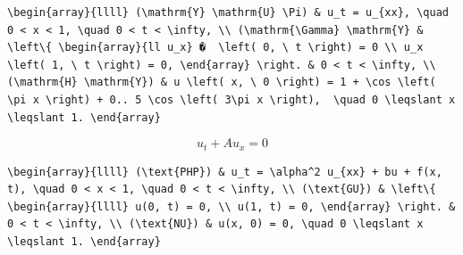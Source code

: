 \documentclass[
  ukrainian,
]{article}
\begin{document}
\begin{verbatim}
\begin{array}{llll} (\mathrm{Y} \mathrm{U} \Pi) & u_t = u_{xx}, \quad 0 < x < 1, \quad 0 < t < \infty, \\ (\mathrm{\Gamma} \mathrm{Y} & \left\{ \begin{array}{ll u_x} �  \left( 0, \ t \right) = 0 \\ u_x \left( 1, \ t \right) = 0, \end{array} \right. & 0 < t < \infty, \\ (\mathrm{H} \mathrm{Y}) & u \left( x, \ 0 \right) = 1 + \cos \left( \pi x \right) + 0.. 5 \cos \left( 3\pi x \right),  \quad 0 \leqslant x \leqslant 1. \end{array}
\end{verbatim}

\[
u_t + Au_x = 0
\]

\begin{verbatim}
\begin{array}{llll} (\text{PHP}) & u_t = \alpha^2 u_{xx} + bu + f(x, t), \quad 0 < x < 1, \quad 0 < t < \infty, \\ (\text{GU}) & \left\{ \begin{array}{llll} u(0, t) = 0, \\ u(1, t) = 0, \end{array} \right. & 0 < t < \infty, \\ (\text{NU}) & u(x, 0) = 0, \quad 0 \leqslant x \leqslant 1. \end{array}
\end{verbatim}
\end{document}
